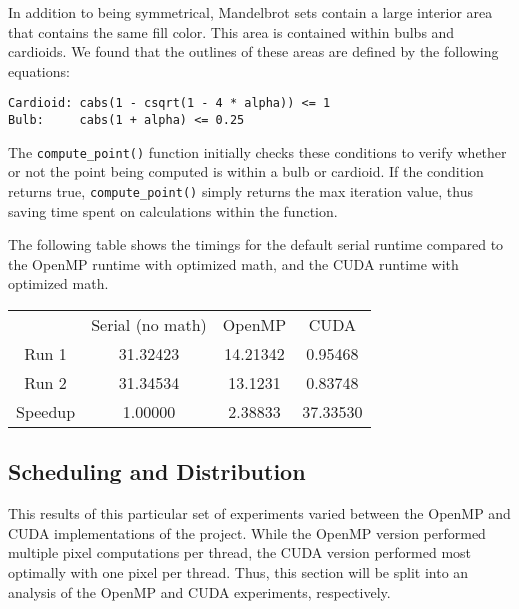 \documentclass{article}
\begin{document}
In addition to being symmetrical, Mandelbrot sets contain a large interior
area that contains the same fill color.
This area is contained within bulbs and cardioids.
We found that the outlines of these areas are defined by the following 
equations:

\begin{verbatim}
Cardioid: cabs(1 - csqrt(1 - 4 * alpha)) <= 1
Bulb:     cabs(1 + alpha) <= 0.25
\end{verbatim}

The \verb|compute_point()| function initially checks these conditions to
verify whether or not the point being computed is within a bulb or cardioid.
If the condition returns true, \verb|compute_point()| simply returns the
max iteration value, thus saving time spent on calculations within the 
function.

The following table shows the timings for the default serial runtime compared to the OpenMP runtime with optimized math, and the CUDA runtime with optimized math.\\

\begin{tabular}{ c c c c}
       & Serial (no math) & OpenMP & CUDA \\ 
 Run 1 & 31.32423 & 14.21342 & 0.95468 \\ 
 Run 2 & 31.34534 & 13.1231  & 0.83748\\ 
 Speedup & 1.00000 & 2.38833 & 37.33530\\
\end{tabular}

\subsection{Scheduling and Distribution}

This results of this particular set of experiments varied between the
OpenMP and CUDA implementations of the project.
While the OpenMP version performed multiple pixel computations per thread,
the CUDA version performed most optimally with one pixel per thread.
Thus, this section will be split into an analysis of the OpenMP and CUDA 
experiments, respectively.\\
\end{document}
